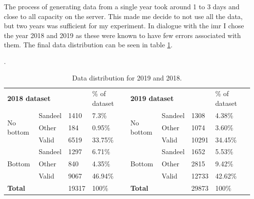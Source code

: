         The process of generating data from a single year took around 1 to 3 days and close to all capacity on the server. This made me decide to not use all the data, but two years was sufficient for my experiment. In dialogue with the \gls{imr} I chose the year 2018 and 2019 as these were known to have few errors associated with them. The final data distribution can be seen in table \ref{data_distribution_table}.
        
        \clearpage
        \begin{table}[H]
        \caption[Data distribution]{Data distribution for 2019 and 2018.}.
        \begin{tabular}{|llll|l|l|lllll|l|l}
        \cline{1-5} \cline{7-12}
        \multicolumn{4}{|l|}{\textbf{2018 dataset}}                                             & \% of dataset &  & \multicolumn{5}{l|}{\textbf{2019 dataset}}                                             & \% of dataset &  \\ \cline{1-5} \cline{7-12}
        \multicolumn{2}{|l|}{\multirow{3}{*}{No bottom}} & \multicolumn{1}{l|}{Sandeel} & 1410  & 7.3\%         &  & \multicolumn{3}{l|}{\multirow{3}{*}{No bottom}} & \multicolumn{1}{l|}{Sandeel} & 1308  & 4.38\%        &  \\ \cline{3-5} \cline{10-12}
        \multicolumn{2}{|l|}{}                           & \multicolumn{1}{l|}{Other}   & 184   & 0.95\%        &  & \multicolumn{3}{l|}{}                           & \multicolumn{1}{l|}{Other}   & 1074  & 3.60\%         &  \\ \cline{3-5} \cline{10-12}
        \multicolumn{2}{|l|}{}                           & \multicolumn{1}{l|}{Valid}   & 6519  & 33.75\%       &  & \multicolumn{3}{l|}{}                           & \multicolumn{1}{l|}{Valid}   & 10291 & 34.45\%       &  \\ \cline{1-5} \cline{7-12}
        \multicolumn{2}{|l|}{\multirow{3}{*}{Bottom}}    & \multicolumn{1}{l|}{Sandeel} & 1297  & 6.71\%        &  & \multicolumn{3}{l|}{\multirow{3}{*}{Bottom}}    & \multicolumn{1}{l|}{Sandeel} & 1652  & 5.53\%        &  \\ \cline{3-5} \cline{10-12}
        \multicolumn{2}{|l|}{}                           & \multicolumn{1}{l|}{Other}   & 840   & 4.35\%        &  & \multicolumn{3}{l|}{}                           & \multicolumn{1}{l|}{Other}   & 2815  & 9.42\%        &  \\ \cline{3-5} \cline{10-12}
        \multicolumn{2}{|l|}{}                           & \multicolumn{1}{l|}{Valid}   & 9067  & 46.94\%       &  & \multicolumn{3}{l|}{}                           & \multicolumn{1}{l|}{Valid}   & 12733 & 42.62\%       &  \\ \cline{1-5} \cline{7-12}
        \multicolumn{3}{|l|}{\textbf{Total}}                                            & 19317 & 100\%         &  & \multicolumn{4}{l|}{\textbf{Total}}                                            & 29873 & 100\%         &  \\ \cline{1-5} \cline{7-12}
        \end{tabular}
        \label{data_distribution_table}
        \end{table}
        
